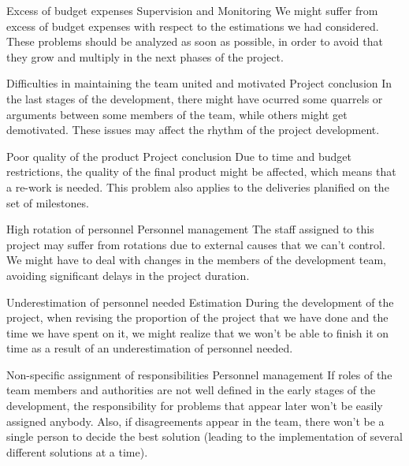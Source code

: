\begin{risk}{Excess of budget expenses}
\riskcat Supervision and Monitoring
\riskdesc We might suffer from excess of budget expenses with respect to the estimations we had considered. These problems should be analyzed as soon as possible, in order to avoid that they grow and multiply in the next phases of the project.
\end{risk}

\begin{risk}{Difficulties in maintaining the team united and motivated}
\riskcat Project conclusion
\riskdesc In the last stages of the development, there might have ocurred some quarrels or arguments between some members of the team, while others might get demotivated. These issues may affect the rhythm of the project development.
\end{risk}

\begin{risk}{Poor quality of the product}
\riskcat Project conclusion
\riskdesc Due to time and budget restrictions, the quality of the final product might be affected, which means that a re-work is needed. This problem also applies to the deliveries planified on the set of milestones.
\end{risk}

\begin{risk}{High rotation of personnel}
\riskcat Personnel management
\riskdesc The staff assigned to this project may suffer from rotations due to external causes that we can't control. We might have to deal with changes in the members of the development team, avoiding significant delays in the project duration.
\end{risk}

\begin{risk}{Underestimation of personnel needed}
\riskcat Estimation
\riskdesc During the development of the project, when revising the proportion of the project that we have done and the time we have spent on it, we might realize that we won't be able to finish it on time as a result of an underestimation of personnel needed. 
\end{risk}

\begin{risk}{Non-specific assignment of responsibilities}
\riskcat Personnel management
\riskdesc If roles of the team members and authorities are not well defined in the early stages of the development, the responsibility for problems that appear later won't be easily assigned anybody. Also, if disagreements appear in the team, there won't be a single person to decide the best solution (leading to the implementation of several different solutions at a time).
\end{risk}


